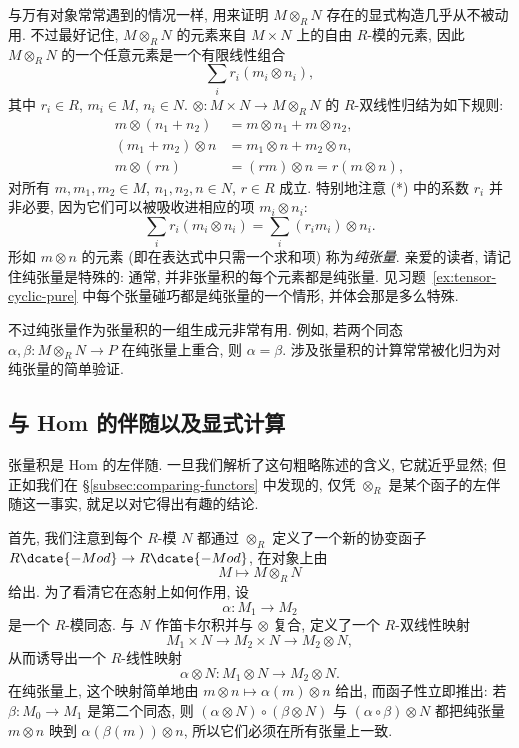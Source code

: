 与万有对象常常遇到的情况一样, 用来证明 $M\otimes_R N$ 存在的显式构造几乎从不被动用. 不过最好记住, $M\otimes_R N$ 的元素来自 $M\times N$ 上的自由 $R$-模的元素, 因此 $M\otimes_R N$ 的一个任意元素是一个有限线性组合
\begin{equation*}\tag{*}
\sum_i r_i(m_i\otimes n_i),
\end{equation*}
其中 $r_i\in R$, $m_i\in M$, $n_i\in N$. $\otimes:M\times N\to M\otimes_R N$ 的 $R$-双线性归结为如下规则:
\[
\begin{aligned}
m\otimes(n_1+n_2)&=m\otimes n_1+m\otimes n_2,\\
(m_1+m_2)\otimes n&=m_1\otimes n+m_2\otimes n,\\
m\otimes(rn)&=(rm)\otimes n=r(m\otimes n),
\end{aligned}
\]
对所有 $m,m_1,m_2\in M$, $n_1,n_2,n\in N$, $r\in R$ 成立. 特别地注意 (*) 中的系数 $r_i$ 并非必要, 因为它们可以被吸收进相应的项 $m_i\otimes n_i$:
\[
\sum_i r_i(m_i\otimes n_i)=\sum_i (r_i m_i)\otimes n_i.
\]
形如 $m\otimes n$ 的元素 (即在表达式中只需一个求和项) 称为\emph{纯张量}. 亲爱的读者, 请记住纯张量是特殊的: 通常, 并非张量积的每个元素都是纯张量. 见习题~\ref{ex:tensor-cyclic-pure} 中每个张量碰巧都是纯张量的一个情形, 并体会那是多么特殊.

不过纯张量作为张量积的一组生成元非常有用. 例如, 若两个同态 $\alpha,\beta:M\otimes_R N\to P$ 在纯张量上重合, 则 $\alpha=\beta$. 涉及张量积的计算常常被化归为对纯张量的简单验证.

\subsection{与 Hom 的伴随以及显式计算}
\label{subsec:tensor-hom-adjunction}

张量积是 Hom 的左伴随. 一旦我们解析了这句粗略陈述的含义, 它就近乎显然; 但正如我们在 §\ref{subsec:comparing-functors} 中发现的, 仅凭 $\otimes_R$ 是某个函子的左伴随这一事实, 就足以对它得出有趣的结论.

首先, 我们注意到每个 $R$-模 $N$ 都通过 $\otimes_R$ 定义了一个新的协变函子 $R\dcate{-Mod}\to R\dcate{-Mod}$, 在对象上由
\[
M\mapsto M\otimes_R N
\]
给出. 为了看清它在态射上如何作用, 设
\[
\alpha:M_1\to M_2
\]
是一个 $R$-模同态. 与 $N$ 作笛卡尔积并与 $\otimes$ 复合, 定义了一个 $R$-双线性映射
\[
M_1\times N\to M_2\times N\to M_2\otimes N,
\]
从而诱导出一个 $R$-线性映射
\[
\alpha\otimes N:M_1\otimes N\to M_2\otimes N.
\]
在纯张量上, 这个映射简单地由 $m\otimes n\mapsto\alpha(m)\otimes n$ 给出, 而函子性立即推出: 若 $\beta:M_0\to M_1$ 是第二个同态, 则 $(\alpha\otimes N)\circ(\beta\otimes N)$ 与 $(\alpha\circ\beta)\otimes N$ 都把纯张量 $m\otimes n$ 映到 $\alpha(\beta(m))\otimes n$, 所以它们必须在所有张量上一致.

